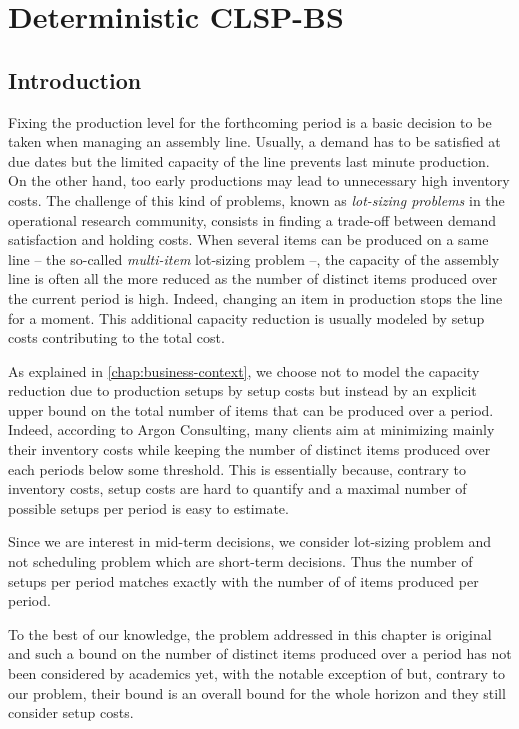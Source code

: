 \chapter{Deterministic CLSP-BS}
\label{chap:PDP:deterministic}


\section{Introduction}
\label{sec:PDP:deterministic:Motivations}

Fixing the production level for the forthcoming period is a basic decision to be taken when managing an assembly line. Usually, a demand has to be satisfied at due dates but the limited capacity of the line prevents last minute production. On the other hand, too early productions may lead to unnecessary high inventory costs. The challenge of this kind of problems, known as {\em lot-sizing problems} in the operational research community, consists in finding a trade-off between demand satisfaction and holding costs.
When several items can be produced on a same line -- the so-called {\em multi-item} lot-sizing problem --, the capacity of the assembly line is often all the more reduced as the number of distinct items produced over the current period is high. Indeed, changing an item in production stops the line for a moment. This additional capacity reduction is usually modeled by setup costs contributing to the total cost.


As explained in \cref{chap:business-context}, we choose not to model the capacity reduction due to production setups by setup costs but instead by an explicit upper bound on the total number of items that can be produced over a period.
Indeed, according to Argon Consulting, many clients aim at minimizing mainly their inventory costs while keeping the number of distinct items produced over each periods below some threshold.
This is essentially because, contrary to inventory costs, setup costs are hard to quantify and a maximal number of possible setups per period is easy to estimate.

Since we are interest in mid-term decisions, we consider lot-sizing problem and not scheduling problem which are short-term decisions. Thus the number of setups per period matches exactly with the number of of items produced per period.


To the best of our knowledge, the problem addressed in this chapter is original and such a bound on the number of distinct items produced over a period has not been considered by academics yet, with the notable exception of \cite{Rubaszewski2011} but, contrary to our problem, their bound is an overall bound for the whole horizon and they still consider setup costs.



